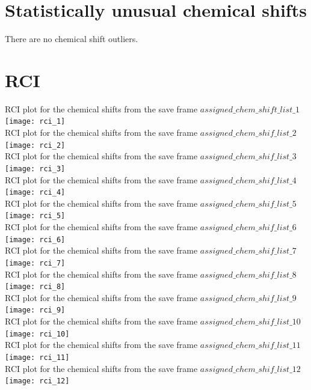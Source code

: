 \section{Statistically unusual chemical shifts}
There are no chemical shift outliers.\
\section{RCI}
RCI plot for the chemical shifts from the  save frame $assigned\_chem\_shift\_list\_1$\\ \texttt{[image: rci\_1]}\\
RCI plot for the chemical shifts from the  save frame $assigned\_chem\_shif\_list\_2$\\ \texttt{[image: rci\_2]}\\
RCI plot for the chemical shifts from the  save frame $assigned\_chem\_shif\_list\_3$\\ \texttt{[image: rci\_3]}\\
RCI plot for the chemical shifts from the  save frame $assigned\_chem\_shif\_list\_4$\\ \texttt{[image: rci\_4]}\\
RCI plot for the chemical shifts from the  save frame $assigned\_chem\_shif\_list\_5$\\ \texttt{[image: rci\_5]}\\
RCI plot for the chemical shifts from the  save frame $assigned\_chem\_shif\_list\_6$\\ \texttt{[image: rci\_6]}\\
RCI plot for the chemical shifts from the  save frame $assigned\_chem\_shif\_list\_7$\\ \texttt{[image: rci\_7]}\\
RCI plot for the chemical shifts from the  save frame $assigned\_chem\_shif\_list\_8$\\ \texttt{[image: rci\_8]}\\
RCI plot for the chemical shifts from the  save frame $assigned\_chem\_shif\_list\_9$\\ \texttt{[image: rci\_9]}\\
RCI plot for the chemical shifts from the  save frame $assigned\_chem\_shif\_list\_10$\\ \texttt{[image: rci\_10]}\\
RCI plot for the chemical shifts from the  save frame $assigned\_chem\_shif\_list\_11$\\ \texttt{[image: rci\_11]}\\
RCI plot for the chemical shifts from the  save frame $assigned\_chem\_shif\_list\_12$\\ \texttt{[image: rci\_12]}\\
